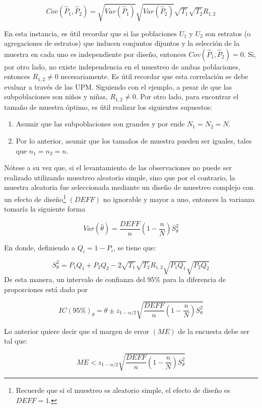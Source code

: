 \documentclass[
  12pt,
]{book}
\providecommand{\tightlist}{%
  \setlength{\itemsep}{0pt}\setlength{\parskip}{0pt}}
\begin{document}
\[
Cov(\hat{P}_1, \hat{P}_2) = \sqrt{Var(\hat{P}_1)}\sqrt{Var(\hat{P}_2)}\sqrt{T_1}\sqrt{T_2}R_{1,2}
\]

En esta instancia, es útil recordar que si las poblaciones \(U_1\) y \(U_2\) son estratos (o agregaciones de estratos) que inducen conjuntos dijuntos y la selección de la muestra en cada uno es independiente por diseño, entonces \(Cov(\hat{P}_1, \hat{P}_2) = 0\). Si, por otro lado, no existe independencia en el muestreo de ambas poblaciones, entonces \(R_{1,2} \neq 0\) necesariamente. Es útil recordar que esta correlación se debe evaluar a través de las UPM. Siguiendo con el ejemplo, a pesar de que las subpoblaciones son niños y niñas, \(R_{1,2} \neq 0\). Por otro lado, para encontrar el tamaño de muestra óptimo, es útil realizar los siguientes supuestos:

\begin{enumerate}
\def\labelenumi{\arabic{enumi}.}
\tightlist
\item
  Asumir que las subpoblaciones son grandes y por ende \(N_1=N_2=N\).
\item
  Por lo anterior, asumir que los tamaños de muestra pueden ser iguales, tales que \(n_1=n_2=n\).
\end{enumerate}

Nótese a su vez que, si el levantamiento de las observaciones no puede ser realizado utilizando muestreo aleatorio simple, sino que por el contrario, la muestra aleatoria fue seleccionada mediante un diseño de muestreo complejo con un efecto de diseño\footnote{Recuerde que si el muestreo es aleatorio simple, el efecto de diseño es \(DEFF=1\).} \((DEFF)\) no ignorable y mayor a uno, entonces la varianza tomaría la siguiente forma

\[
Var(\hat{\theta})=\frac{DEFF}{n}\left(1-\frac{n}{N}\right)S^2_{\theta}
\]

En donde, definiendo a \(Q_i = 1-P_i\), se tiene que:

\[
S^2_{\theta} = P_1Q_1+P_2Q_2 - 2 \sqrt{T_1}\sqrt{T_2}R_{1,2} \sqrt{P_1Q_1}\sqrt{P_2Q_2}
\]
De esta manera, un intervalo de confianza del 95\% para la diferencia de proporciones está dado por

\[
IC(95\%)_{\theta}=\hat{\theta} \pm z_{1-\alpha/2} \sqrt{\frac{DEFF}{n}\left(1-\frac{n}{N}\right)S^2_{\theta}}
\]

Lo anterior quiere decir que el margen de error \((ME)\) de la encuesta debe ser tal que:

\[
ME < z_{1-\alpha/2} \sqrt{\frac{DEFF}{n}\left(1-\frac{n}{N}\right)S^2_{\theta}}
\]
\end{document}

